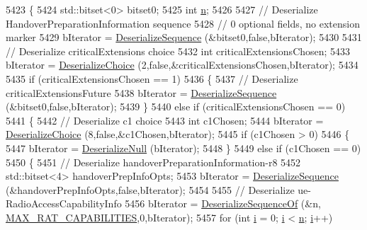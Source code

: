 \begin{DoxyCode}
5423 \{
5424   std::bitset<0> bitset0;
5425   \textcolor{keywordtype}{int} \hyperlink{namespacesample-rng-plot_aeb5ee5c431e338ef39b7ac5431242e1d}{n};
5426 
5427   \textcolor{comment}{// Deserialize HandoverPreparationInformation sequence}
5428   \textcolor{comment}{// 0 optional fields, no extension marker}
5429   bIterator = \hyperlink{classns3_1_1Asn1Header_a58c68bb97ba3fe2e8fcdd7c208d672b2}{DeserializeSequence} (&bitset0,\textcolor{keyword}{false},bIterator);
5430 
5431   \textcolor{comment}{// Deserialize criticalExtensions choice}
5432   \textcolor{keywordtype}{int} criticalExtensionsChosen;
5433   bIterator = \hyperlink{classns3_1_1Asn1Header_a0af5881f07a0549a8693a1b75c229a90}{DeserializeChoice} (2,\textcolor{keyword}{false},&criticalExtensionsChosen,bIterator);
5434 
5435   \textcolor{keywordflow}{if} (criticalExtensionsChosen == 1)
5436     \{
5437       \textcolor{comment}{// Deserialize criticalExtensionsFuture}
5438       bIterator = \hyperlink{classns3_1_1Asn1Header_a58c68bb97ba3fe2e8fcdd7c208d672b2}{DeserializeSequence} (&bitset0,\textcolor{keyword}{false},bIterator);
5439     \}
5440   \textcolor{keywordflow}{else} \textcolor{keywordflow}{if} (criticalExtensionsChosen == 0)
5441     \{
5442       \textcolor{comment}{// Deserialize c1 choice}
5443       \textcolor{keywordtype}{int} c1Chosen;
5444       bIterator = \hyperlink{classns3_1_1Asn1Header_a0af5881f07a0549a8693a1b75c229a90}{DeserializeChoice} (8,\textcolor{keyword}{false},&c1Chosen,bIterator);
5445       \textcolor{keywordflow}{if} (c1Chosen > 0)
5446         \{
5447           bIterator = \hyperlink{classns3_1_1Asn1Header_a29bd4508f3f1ef636b3480f524fac0ce}{DeserializeNull} (bIterator);
5448         \}
5449       \textcolor{keywordflow}{else} \textcolor{keywordflow}{if} (c1Chosen == 0)
5450         \{
5451           \textcolor{comment}{// Deserialize handoverPreparationInformation-r8}
5452           std::bitset<4> handoverPrepInfoOpts;
5453           bIterator = \hyperlink{classns3_1_1Asn1Header_a58c68bb97ba3fe2e8fcdd7c208d672b2}{DeserializeSequence} (&handoverPrepInfoOpts,\textcolor{keyword}{false},bIterator);
5454 
5455           \textcolor{comment}{// Deserialize ue-RadioAccessCapabilityInfo}
5456           bIterator = \hyperlink{classns3_1_1Asn1Header_a1a7245e05b482df8abade0a060bd0ecc}{DeserializeSequenceOf} (&n,
      \hyperlink{lte-rrc-header_8cc_ac4d6753fe892830703ec19f19470b9a0}{MAX\_RAT\_CAPABILITIES},0,bIterator);
5457           \textcolor{keywordflow}{for} (\textcolor{keywordtype}{int} \hyperlink{bernuolliDistribution_8m_a6f6ccfcf58b31cb6412107d9d5281426}{i} = 0; \hyperlink{bernuolliDistribution_8m_a6f6ccfcf58b31cb6412107d9d5281426}{i} < \hyperlink{namespacesample-rng-plot_aeb5ee5c431e338ef39b7ac5431242e1d}{n}; \hyperlink{bernuolliDistribution_8m_a6f6ccfcf58b31cb6412107d9d5281426}{i}++)

\end{DoxyCode}
